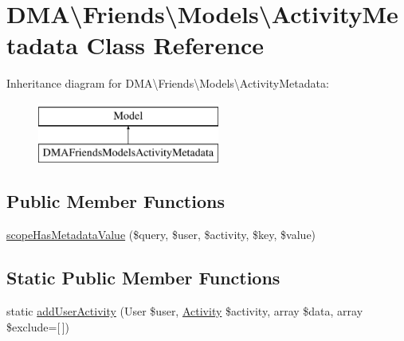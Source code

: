 \hypertarget{classDMA_1_1Friends_1_1Models_1_1ActivityMetadata}{\section{D\+M\+A\textbackslash{}Friends\textbackslash{}Models\textbackslash{}Activity\+Metadata Class Reference}
\label{classDMA_1_1Friends_1_1Models_1_1ActivityMetadata}
}
Inheritance diagram for D\+M\+A\textbackslash{}Friends\textbackslash{}Models\textbackslash{}Activity\+Metadata\+:\begin{figure}[H]
\begin{center}
\leavevmode
\includegraphics[height=2.000000cm]{de/d4f/classDMA_1_1Friends_1_1Models_1_1ActivityMetadata}
\end{center}
\end{figure}
\subsection*{Public Member Functions}
\begin{DoxyCompactItemize}
\item 
\hyperlink{classDMA_1_1Friends_1_1Models_1_1ActivityMetadata_a93dc8a8c1ebf8bbe7f56e665751597ab}{scope\+Has\+Metadata\+Value} (\$query, \$user, \$activity, \$key, \$value)
\end{DoxyCompactItemize}
\subsection*{Static Public Member Functions}
\begin{DoxyCompactItemize}
\item 
static \hyperlink{classDMA_1_1Friends_1_1Models_1_1ActivityMetadata_ae65caa4e45de84ab2518f465d328fc24}{add\+User\+Activity} (User \$user, \hyperlink{classDMA_1_1Friends_1_1Models_1_1Activity}{Activity} \$activity, array \$data, array \$exclude=\mbox{[}$\,$\mbox{]})
\end{DoxyCompactItemize}
